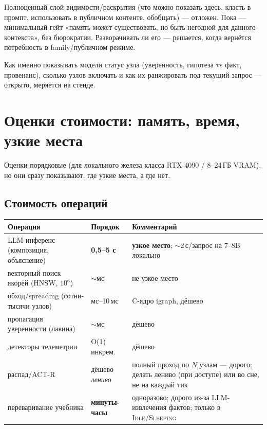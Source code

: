 \begin{openq}
Полноценный слой видимости/раскрытия (что можно показать здесь, класть в промпт,
использовать в публичном контенте, обобщать) — отложен. Пока — минимальный гейт
«память может существовать, но быть негодной для данного контекста», без бюрократии.
Разворачивать ли его — решается, когда вернётся потребность в family/публичном режиме.
\end{openq}

\begin{openq}
Как именно показывать модели статус узла (уверенность, гипотеза vs факт, провенанс),
сколько узлов включать и как их ранжировать под текущий запрос — открыто, меряется на
стенде.
\end{openq}

\section{Оценки стоимости: память, время, узкие места}
\label{sec:costs}

Оценки порядковые (для локального железа класса RTX 4090 / 8--24\,ГБ VRAM),
но они сразу показывают, где узкие места, а где нет.

\subsection{Стоимость операций}

\begin{center}
\begin{tabular}{p{} p{} p{}}
\toprule
\textbf{Операция} & \textbf{Порядок} & \textbf{Комментарий} \\
\midrule
LLM-инференс (композиция, объяснение) & \textbf{0,5--5 с} & \textbf{узкое место}; $\sim$2\,с/запрос на 7--8B локально \\
векторный поиск якорей (HNSW, $10^6$) & $\sim$мс & не узкое место \\
обход/spreading (сотни-тысячи узлов) & мс--10\,мс & C-ядро igraph, дёшево \\
пропагация уверенности (лавина) & $\sim$мс & дёшево \\
детекторы телеметрии & O(1) инкрем. & дёшево \\
распад/ACT-R & дёшево \emph{лениво} & полный проход по $N$ узлам — дорого; делать лениво (при доступе) или во сне, не на каждый тик \\
переваривание учебника & \textbf{минуты-часы} & одноразово; дорого из-за LLM-извлечения фактов; только в \textsc{Idle}/\textsc{Sleeping} \\
\bottomrule
\end{tabular}
\end{center}

